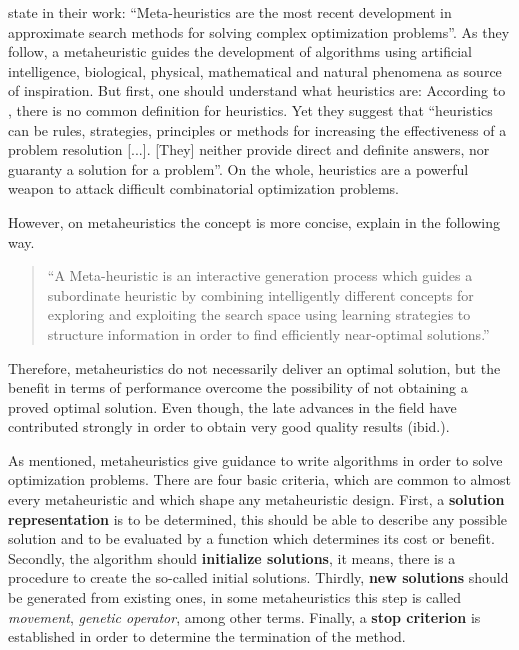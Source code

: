 \documentclass[tuberlin,cic,tc,openright,english,noabntcite,oneside]{iiufrgs}
\begin{document}
\textcite[p. 1]{osman_meta-heuristics:_2012} state in their work: \enquote{Meta-heuristics are the most recent development in approximate search methods for solving complex optimization problems}. As they follow, a metaheuristic guides the development of algorithms using artificial intelligence, biological, physical, mathematical and natural phenomena as source of inspiration. But first, one should understand what heuristics are: According to \textcite[p. 13]{carvalho_121_2004}, there is no common definition for heuristics. Yet they suggest that \enquote{heuristics can be rules, strategies, principles or methods for increasing the effectiveness of a problem resolution [...]. [They] neither provide direct and definite answers, nor guaranty a solution for a problem}. On the whole, heuristics are a powerful weapon to attack difficult combinatorial optimization problems.

However, on metaheuristics the concept is more concise, \textcite[p. 3]{osman_meta-heuristics:_2012} explain in the following way.

\begin{quote}
\enquote{A Meta-heuristic is an interactive generation process which guides a subordinate heuristic by combining intelligently different concepts for exploring and exploiting the search space using learning strategies to structure information in order to find efficiently near-optimal solutions.}
\end{quote}

Therefore, metaheuristics do not necessarily deliver an optimal solution, but the benefit in terms of performance overcome the possibility of not obtaining a proved optimal solution. Even though, the late advances in the field have contributed strongly in order to obtain very good quality results (ibid.).

As mentioned, metaheuristics give guidance to write algorithms in order to solve optimization problems. There are four basic criteria, which are common to almost every metaheuristic and which shape any metaheuristic design. First, a \textbf{solution representation} is to be determined, this should be able to describe any possible solution and to be evaluated by a function which determines its cost or benefit. Secondly, the algorithm should \textbf{initialize solutions}, it means, there is a procedure to create the so-called initial solutions. Thirdly, \textbf{new solutions} should be generated from existing ones, in some metaheuristics this step is called \emph{movement}, \emph{genetic operator}, among other terms. Finally, a \textbf{stop criterion} is established in order to determine the termination of the method.
\end{document}
